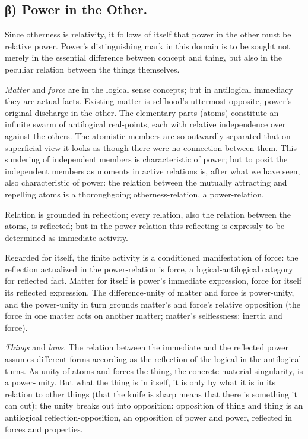 \documentclass[12pt]{book}
\begin{document}
\subsection*{β) Power in the Other.}

Since otherness is relativity, it follows of itself that power in
the other must be relative power. Power's distinguishing mark in
this domain is to be sought not merely in the essential difference
between concept and thing, but also in the peculiar relation between
the things themselves.

\emph{Matter} and \emph{force} are in the logical sense concepts;
but in antilogical immediacy they are actual facts. Existing matter
is selfhood's uttermost opposite, power's original discharge in the
other. The elementary parts (atoms) constitute an infinite swarm of
antilogical real-points, each with relative independence over
against the others. The atomistic members are so outwardly separated
that on superficial view it looks as though there were no connection
between them. This sundering of independent members is
characteristic of power; but to posit the independent members as
moments in active relations is, after what we have seen, also
characteristic of power: the relation between the mutually
attracting and repelling atoms is a thoroughgoing otherness-relation,
a power-relation.

Relation is grounded in reflection; every relation, also the
relation between the atoms, is reflected; but in the power-relation
this reflecting is expressly to be determined as immediate activity.

Regarded for itself, the finite activity is a conditioned
manifestation of force: the reflection actualized in the
power-relation is force, a logical-antilogical category for
reflected fact. Matter for itself is power's immediate expression,
force for itself its reflected expression. The difference-unity of
matter and force is power-unity, and the power-unity in turn grounds
matter's and force's relative opposition (the force in one matter
acts on another matter; matter's selflessness: inertia and force).

\emph{Things} and \emph{laws}. The relation between the immediate
and the reflected power assumes different forms according as the
reflection of the logical in the antilogical turns. As unity of
atoms and forces the thing, the concrete-material singularity, is a
power-unity. But what the thing is in itself, it is only by what it
is in its relation to other things (that the knife is sharp means
that there is something it can cut); the unity breaks out into
opposition: opposition of thing and thing is an antilogical
reflection-opposition, an opposition of power and power, reflected
in forces and properties.
\end{document}
